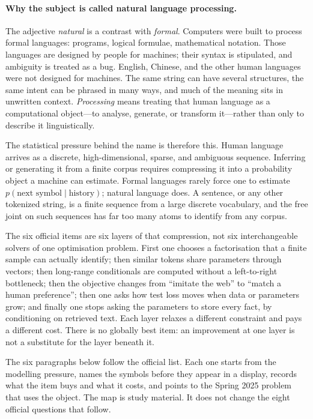 \documentclass[11pt,a4paper]{article}
\theoremstyle{definition}
\begin{document}
\paragraph{Why the subject is called natural language processing.}
The adjective \emph{natural} is a contrast with \emph{formal}. Computers were built to process formal languages: programs, logical formulae, mathematical notation. Those languages are designed by people for machines; their syntax is stipulated, and ambiguity is treated as a bug. English, Chinese, and the other human languages were not designed for machines. The same string can have several structures, the same intent can be phrased in many ways, and much of the meaning sits in unwritten context. \emph{Processing} means treating that human language as a computational object---to analyse, generate, or transform it---rather than only to describe it linguistically.

The statistical pressure behind the name is therefore this. Human language arrives as a discrete, high-dimensional, sparse, and ambiguous sequence. Inferring or generating it from a finite corpus requires compressing it into a probability object a machine can estimate. Formal languages rarely force one to estimate \(p(\text{next symbol}\mid\text{history})\); natural language does. A sentence, or any other tokenized string, is a finite sequence from a large discrete vocabulary, and the free joint on such sequences has far too many atoms to identify from any corpus.

The six official items are six layers of that compression, not six interchangeable solvers of one optimisation problem. First one chooses a factorisation that a finite sample can actually identify; then similar tokens share parameters through vectors; then long-range conditionals are computed without a left-to-right bottleneck; then the objective changes from ``imitate the web'' to ``match a human preference''; then one asks how test loss moves when data or parameters grow; and finally one stops asking the parameters to store every fact, by conditioning on retrieved text. Each layer relaxes a different constraint and pays a different cost. There is no globally best item: an improvement at one layer is not a substitute for the layer beneath it.

The six paragraphs below follow the official list. Each one starts from the modelling pressure, names the symbols before they appear in a display, records what the item buys and what it costs, and points to the Spring 2025 problem that uses the object. The map is study material. It does not change the eight official questions that follow.
\end{document}
